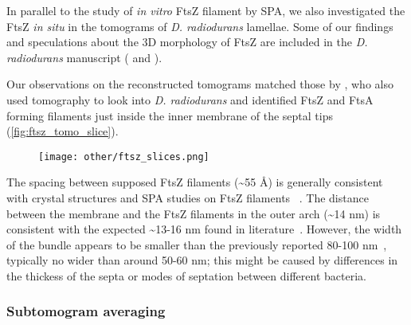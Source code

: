 In parallel to the study of \textit{in vitro} FtsZ filament by SPA, we also investigated the FtsZ \textit{in situ} in the tomograms of \textit{D. radiodurans} lamellae.
Some of our findings and speculations about the 3D morphology of FtsZ are included in the \textit{D. radiodurans} manuscript ( and ).

Our observations on the reconstructed tomograms matched those by \citet{sextonSuperresolutionConfocalCryoCLEM2022}, who also used tomography to look into \textit{D. radiodurans} and identified FtsZ and FtsA forming filaments just inside the inner membrane of the septal tips (\autoref{fig:ftsz_tomo_slice}). %

\begin{figure}[ht]
    \centering
    \texttt{[image: other/ftsz\_slices.png]}
    \label{fig:ftsz_tomo_slice}
\end{figure}

The spacing between supposed FtsZ filaments (\sim55 Å) is generally consistent with crystal structures and SPA studies on FtsZ filaments ~\cite{mcquillenInsightsStructureFunction2020}.
The distance between the membrane and the FtsZ filaments in the outer arch (\sim14 nm) is consistent with the expected \sim13-16 nm found in literature~\cite{mcquillenInsightsStructureFunction2020}.
However, the width of the bundle appears to be smaller than the previously reported 80-100 nm~\cite{mcquillenInsightsStructureFunction2020}, typically no wider than around 50-60 nm; this might be caused by differences in the thickess of the septa or modes of septation between different bacteria.

\subsubsection{Subtomogram averaging}

